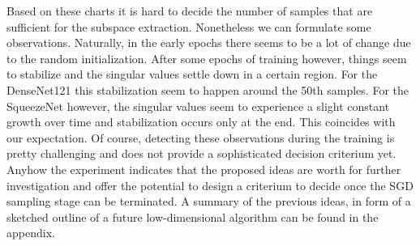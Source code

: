 \documentclass[11pt, a4paper]{article}
\begin{document}
Based on these charts it is hard to decide the number of samples that are sufficient for the subspace extraction. Nonetheless we can formulate some observations. Naturally, in the early epochs there seems to be a lot of change due to the random initialization. After some epochs of training however, things seem to stabilize and the singular values settle down in a certain region. For the DenseNet121 this stabilization seem to happen around the 50th samples. For the SqueezeNet however, the singular values seem to experience a slight constant growth over time and stabilization occurs only at the end. This coincides with our expectation. Of course, detecting these observations during the training is pretty challenging and does not provide a sophisticated decision criterium yet. Anyhow the experiment indicates that the proposed ideas are worth for further investigation and offer the potential to design a criterium to decide once the SGD sampling stage can be terminated. A summary of the previous ideas, in form of a sketched outline of a future low-dimensional algorithm can be found in the appendix. 
\end{document}
